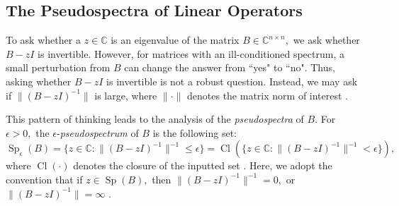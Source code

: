  \subsection{The Pseudospectra of Linear Operators}\label{pseudo sec}




To ask whether a $z\in \mathbb{C}$ is an eigenvalue of the matrix $B \in \mathbb{C}^{n \times n},$ we ask whether $B-zI$ is invertible. However, for matrices with an ill-conditioned spectrum, a small perturbation from $B$ can change the answer from ``yes" to ``no". Thus, asking whether $B-zI$ is invertible is not a robust question. Instead, we may ask if $\|(B-zI)^{-1}\|$ is large, where $\|\cdot\|$ denotes the matrix norm of interest \cite{Nick}. 

This pattern of thinking leads to the analysis of the \textit{pseudospectra} of $B.$ For $\epsilon > 0,$ the $\epsilon$-\textit{pseudospectrum} of $B$ is the following set:
\begin{equation} \label{eps B}
    \operatorname{Sp}_{\epsilon}(B) = \{z \in \mathbb{C}:\|(B-zI)^{-1} \|^{-1} \le \epsilon \} = \operatorname{Cl} \left(\{z \in \mathbb{C} : \|(B-zI)^{-1} \|^{-1} < \epsilon \} \right),
\end{equation}
where $\operatorname{Cl}(\cdot)$ denotes the closure of the inputted set \cite{Matt}. Here, we adopt the convention that if $z \in \operatorname{Sp}(B),$ then $\|(B-zI)^{-1}\|^{-1} = 0,$ or $\|(B-zI)^{-1}\| = \infty$ \cite{Matt, Nick}. 

